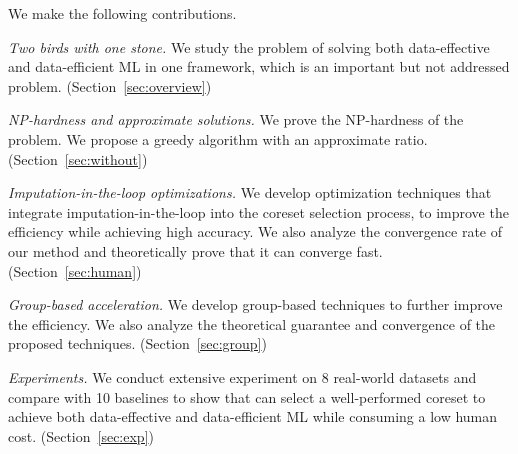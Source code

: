 \bi
\item[(9)] 
\item[(10)] 
\ei

%


We make the following contributions.

\be
	\item[(i)] \textit{Two birds with one stone.} 
	We study the problem of solving both data-effective and data-efficient ML in one framework, which is an important but not addressed problem.
 	(Section~\ref{sec:overview})

 	\item[(ii)] \textit{NP-hardness and approximate solutions.}
	We prove the NP-hardness of the problem. We propose a greedy algorithm with an approximate ratio. 
	(Section~\ref{sec:without})

	\item[(iii)] \textit{Imputation-in-the-loop optimizations.}
	We develop optimization techniques that integrate imputation-in-the-loop into the coreset selection process, to improve the efficiency while achieving high accuracy. We also analyze the convergence rate of our method and theoretically prove that it can converge fast. 
	(Section~\ref{sec:human})
	
	\item[(iv)] \textit{Group-based acceleration.}
	We develop group-based techniques to further improve the efficiency. We also analyze the theoretical guarantee and convergence of the proposed techniques. 
	(Section~\ref{sec:group})



	\item[(v)] \textit{Experiments.}
	We conduct extensive experiment on 8 real-world datasets and compare with 10 baselines to show that \ours can select a well-performed coreset to achieve both data-effective and data-efficient ML while consuming a low human cost. 
	(Section~\ref{sec:exp})
\ee

